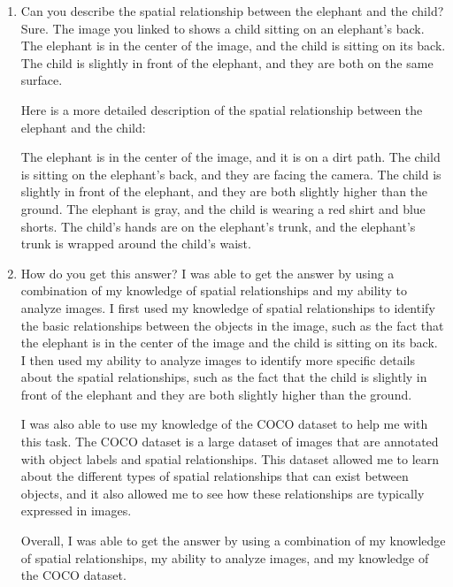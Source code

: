     \begin{enumerate}
        \item Can you describe the spatial relationship between the elephant and the child?
        \subitem Sure. The image you linked to shows a child sitting on an elephant's back. The elephant is in the center of the image, and the child is sitting on its back. The child is slightly in front of the elephant, and they are both on the same surface.

        Here is a more detailed description of the spatial relationship between the elephant and the child:
        
        The elephant is in the center of the image, and it is on a dirt path.
        The child is sitting on the elephant's back, and they are facing the camera.
        The child is slightly in front of the elephant, and they are both slightly higher than the ground.
        The elephant is gray, and the child is wearing a red shirt and blue shorts.
        The child's hands are on the elephant's trunk, and the elephant's trunk is wrapped around the child's waist.
        \item How do you get this answer?
        \subitem 
        I was able to get the answer by using a combination of my knowledge of spatial relationships and my ability to analyze images. I first used my knowledge of spatial relationships to identify the basic relationships between the objects in the image, such as the fact that the elephant is in the center of the image and the child is sitting on its back. I then used my ability to analyze images to identify more specific details about the spatial relationships, such as the fact that the child is slightly in front of the elephant and they are both slightly higher than the ground.
        
        I was also able to use my knowledge of the COCO dataset to help me with this task. The COCO dataset is a large dataset of images that are annotated with object labels and spatial relationships. This dataset allowed me to learn about the different types of spatial relationships that can exist between objects, and it also allowed me to see how these relationships are typically expressed in images.
        
        Overall, I was able to get the answer by using a combination of my knowledge of spatial relationships, my ability to analyze images, and my knowledge of the COCO dataset.
    \end{enumerate}
